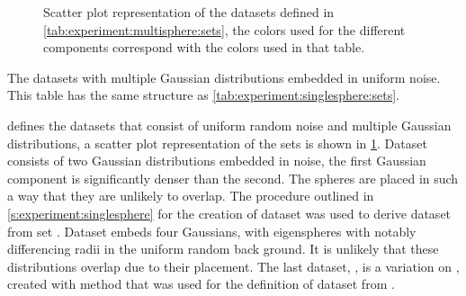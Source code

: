 
\begin{figure}
	\centering
	
	\caption{Scatter plot representation of the datasets defined in \cref{tab:experiment:multisphere:sets}, the colors used for the different components correspond with the colors used in that table.}
	\label{fig:experiment:multisphere:sets}
\end{figure}

\begin{table*}
	\centering
	
	\caption{The datasets with multiple Gaussian distributions embedded in uniform noise. This table has the same structure as \cref{tab:experiment:singlesphere:sets}.} 	
	\label{tab:experiment:multisphere:sets}
\end{table*}

 defines the datasets that consist of uniform random noise and multiple Gaussian distributions, a scatter plot representation of the sets is shown in \cref{fig:experiment:multisphere:sets}. 
	Dataset \ferdosiTwo consists of two Gaussian distributions embedded in noise, the first Gaussian component is significantly denser than the second. The spheres are placed in such a way that they are unlikely to overlap. 
	The procedure outlined in \cref{s:experiment:singlesphere} for the creation of dataset \baakmanOne was used to derive dataset \baakmanTwo from set \ferdosiTwo.
	Dataset \ferdosiThree embeds four Gaussians, with eigenspheres with notably differencing radii in the uniform random back ground. It is unlikely that these distributions overlap due to their placement. 
	The last dataset, \baakmanThree, is a variation on \ferdosiThree, created with method that was used for the definition of dataset \baakmanTwo from \baakmanOne. 

